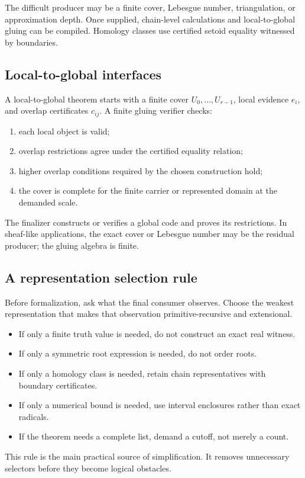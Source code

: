 The difficult producer may be a finite cover, Lebesgue number, triangulation, or approximation depth.  Once supplied, chain-level calculations and local-to-global gluing can be compiled.  Homology classes use certified setoid equality witnessed by boundaries.

\subsection{Local-to-global interfaces}

A local-to-global theorem starts with a finite cover \(U_0,\ldots,U_{r-1}\), local evidence \(e_i\), and overlap certificates \(c_{ij}\).  A finite gluing verifier checks:
\begin{enumerate}
\item each local object is valid;
\item overlap restrictions agree under the certified equality relation;
\item higher overlap conditions required by the chosen construction hold;
\item the cover is complete for the finite carrier or represented domain at the demanded scale.
\end{enumerate}
The finalizer constructs or verifies a global code and proves its restrictions.  In sheaf-like applications, the exact cover or Lebesgue number may be the residual producer; the gluing algebra is finite.

\subsection{A representation selection rule}

Before formalization, ask what the final consumer observes.  Choose the weakest representation that makes that observation primitive-recursive and extensional.

\begin{itemize}
\item If only a finite truth value is needed, do not construct an exact real witness.
\item If only a symmetric root expression is needed, do not order roots.
\item If only a homology class is needed, retain chain representatives with boundary certificates.
\item If only a numerical bound is needed, use interval enclosures rather than exact radicals.
\item If the theorem needs a complete list, demand a cutoff, not merely a count.
\end{itemize}

This rule is the main practical source of simplification.  It removes unnecessary selectors before they become logical obstacles.
